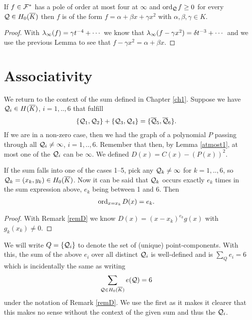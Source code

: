 \documentclass[english,11pt,a4paper]{article}
\begin{document}
\begin{lemma}\label{fourpoles}
  If $f \in \mathcal{F}^*$ has a pole of order at most four at $\infty$ and $\text{ord}_{\mathcal{Q}}\hspace{0.4mm} f \geq 0$ for every $\mathcal{Q} \in H_0(\overline K)$ then $f$ is of the form $f = \alpha + \beta x + \gamma x^2$ with $\alpha, \beta, \gamma \in K$.
  \begin{proof}
    With $\lambda_{\infty} (f) = \gamma t^{-4} + \cdots$ we know that $\lambda_{\infty} (f - \gamma x^2) = \delta t^{-3} + \cdots$ and we use the previous Lemma to see that $f - \gamma x^2 = \alpha + \beta x$.
  \end{proof}
\end{lemma}

\newpage

\section{Associativity}

We return to the context of the sum defined in Chapter \ref{ch1}. Suppose we have $\mathcal{Q}_i \in H(\overline K)$, $i=1,..,6$ that fulfill
\begin{align*}
  \{ \mathcal{Q}_1 , \mathcal{Q}_2\}+\{\mathcal{Q}_3 , \mathcal{Q}_4\} = \{\overline {\mathcal{Q}}_5 , \overline {\mathcal{Q}}_6 \}.
\end{align*}
If we are in a non-zero case, then we had the graph of a polynomial $P$ passing through all $\mathcal{Q}_i \neq \infty$, $i = 1,..,6$. Remember that then, by Lemma \ref{atmost1}, at most one of the $\mathcal{Q}_i$ can be $\infty$. We defined $D(x) = C(x) - (P(x))^2$.
\begin{lemma}\label{mult}
  If the sum falls into one of the cases 1--5, pick any $\mathcal{Q}_k \neq \infty$ for $k = 1,..,6$, so $\mathcal{Q}_k = (x_k, y_k) \in H_0(\overline K)$. Now it can be said that $\mathcal{Q}_k$ occurs exactly $e_k$ times in the sum expression above, $e_k$ being between
  1 and 6.
  Then\vspace{-3mm}
  \begin{align*}
    \text{ord}_{x=x_k}\hspace{0.4mm} D(x) = e_k.
  \end{align*}
  \begin{proof}
    With  Remark \ref{remD} we know $D(x) = (x - x_k)^{e_k} g(x)$ with $g_k(x_k) \neq 0$.
  \end{proof}
\end{lemma}

We will write $Q = \{ \mathcal{Q}_i \}$ to denote the set of (unique) point-components. With this, the sum of the above $e_i$ over all distinct $\mathcal{Q}_i$ is well-defined and is $\sum_Q e_i = 6$ which is incidentally the same as writing 
\begin{align*}
  \sum_{\mathcal{Q} \in H_0(\overline K)} e(\mathcal{Q}) = 6
\end{align*}
under the notation of Remark \ref{remD}. We use the first as it makes it clearer that this makes no sense without the context of the given sum and thus the $\mathcal{Q}_i$.
\end{document}
